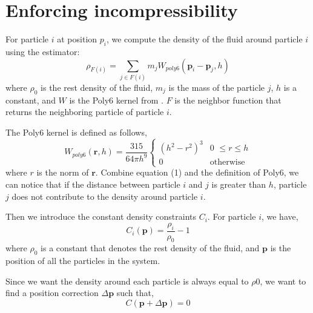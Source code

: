 \documentclass[sigconf]{acmart}
\newcommand{\vect}[1]{\boldsymbol{#1}}
\begin{document}
\section{Enforcing incompressibility}
For particle $i$ at position $p_i$, we compute the density of the fluid around particle $i$ using the estimator:
\begin{equation}
  \rho_{F(i)} = \sum_{j \in F(i)} m_j W_{poly6}(\vect{p}_i - \vect{p}_j, h)
\end{equation}
where $\rho_0$ is the rest density of the fluid, $m_j$ is the mass of the particle $j$, $h$ is a constant, and $W$ is the Poly6 kernel from \cite{10.5555/846276.846298}. $F$ is the neighbor function that returns the neighboring particle of particle $i$.

The Poly6 kernel is defined as follows,
\begin{equation*}
  W_{poly6}(\vect{r}, h) = \frac{315}{64 \pi h^9}
  \begin{cases}
    (h^2 - r^2)^3 &\text{0 $\leq r \leq h$} \\
    0 &\text{otherwise}
  \end{cases}
\end{equation*}
where $r$ is the norm of $\vect{r}$. Combine equation (1) and the definition of Poly6, we can notice that if the distance between particle $i$ and $j$ is greater than $h$, particle $j$ does not contribute to the density around particle $i$.

Then we introduce the constant density constraints $C_i$. For particle $i$, we have,
\begin{equation}
  C_i(\vect{p}) = \frac{\rho_i}{\rho_0} - 1
\end{equation}
where $\rho_0$ is a constant that denotes the rest density of the fluid, and $\vect{p}$ is the position of all the particles in the system.

Since we want the density around each particle is always equal to $\rho0$, we want to find a position correction $ \Delta \vect{\vect{p}}$ such that,
\begin{equation}
  C(\vect{p} + \Delta \vect{\vect{p}}) = 0
\end{equation}
\end{document}
